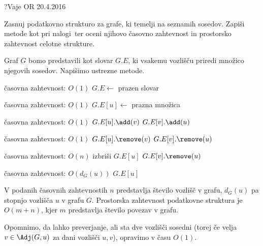 \begin{naloga}{?}{Vaje OR 20.4.2016}
\begin{vprasanje}
Zasnuj podatkovno strukturo za grafe,
ki temelji na seznamih sosedov.
Zapiši metode kot pri nalogi~\nal[matgraf]
ter oceni njihovo časovno zahtevnost
in prostorsko zahtevnost celotne strukture.
\end{vprasanje}

\begin{odgovor}
Graf $G$ bomo predstavili kot slovar $G.E$,
ki vsakemu vozlišču priredi množico njegovih sosedov.
Napišimo ustrezne metode.

\begin{small}
\begin{algorithmic}
 \hfill časovna zahtevnost: $O(1)$
    \State $G.E \gets$ prazen slovar
\EndFunction
\end{algorithmic}

\begin{algorithmic}
 \hfill časovna zahtevnost: $O(1)$
    \State $G.E[u] \gets$ prazna množica
\EndFunction
\end{algorithmic}

\begin{algorithmic}
 \hfill časovna zahtevnost: $O(1)$
    \State $G.E[u].\add(v)$
    \State $G.E[v].\add(u)$
\EndFunction
\end{algorithmic}

\begin{algorithmic}
 \hfill časovna zahtevnost: $O(1)$
    \State $G.E[u].\remove(v)$
    \State $G.E[v].\remove(u)$
\EndFunction
\end{algorithmic}

\begin{algorithmic}
 \hfill časovna zahtevnost: $O(n)$
    \State izbriši $G.E[u]$
        \State $G.E[v].\remove(u)$
    \EndFor
\EndFunction
\end{algorithmic}

\begin{algorithmic}
 \hfill časovna zahtevnost: $O(d_G(u))$
    \State \Return $G.E[u]$
\EndFunction
\end{algorithmic}
\end{small}
V podanih časovnih zahtevnostih $n$ predstavlja število vozlišč v grafu,
$d_G(u)$ pa stopnjo vozlišča $u$ v grafu $G$.
Prostorska zahtevnost podatkovne struktura je $O(m+n)$,
kjer $m$ predstavlja število povezav v grafu.

Opomnimo, da lahko preverjanje, ali sta dve vozlišči sosedni
(torej če velja $v \in \Adj(G, u)$ za dani vozlišči $u, v$),
opravimo v času $O(1)$.
\end{odgovor}
\end{naloga}
